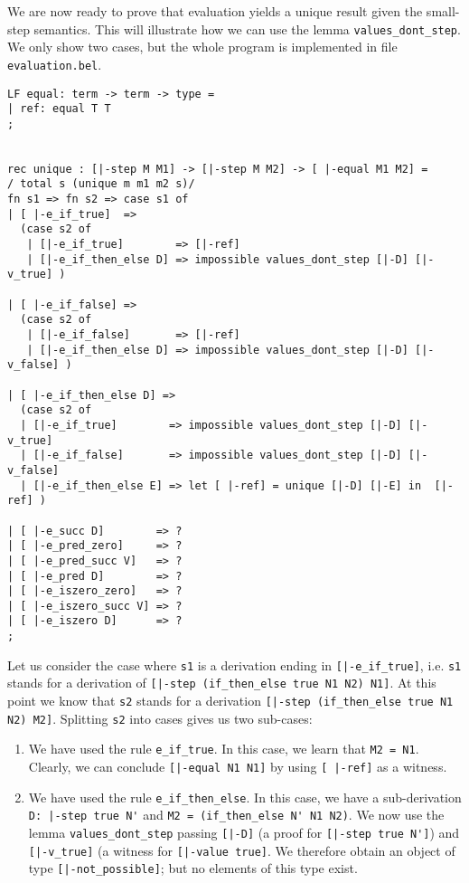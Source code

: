 We are now ready to prove that evaluation yields a unique result given the
small-step semantics. This will illustrate how we can use the lemma \lstinline!values_dont_step!. We only show two cases, but the whole program is
implemented in file \lstinline!evaluation.bel!.

\begin{lstlisting}
LF equal: term -> term -> type =
| ref: equal T T
;


rec unique : [|-step M M1] -> [|-step M M2] -> [ |-equal M1 M2] =
/ total s (unique m m1 m2 s)/
fn s1 => fn s2 => case s1 of
| [ |-e_if_true]  =>
  (case s2 of
   | [|-e_if_true]        => [|-ref]
   | [|-e_if_then_else D] => impossible values_dont_step [|-D] [|-v_true] )

| [ |-e_if_false] =>
  (case s2 of
   | [|-e_if_false]       => [|-ref]
   | [|-e_if_then_else D] => impossible values_dont_step [|-D] [|-v_false] )

| [ |-e_if_then_else D] =>
  (case s2 of
  | [|-e_if_true]        => impossible values_dont_step [|-D] [|-v_true] 
  | [|-e_if_false]       => impossible values_dont_step [|-D] [|-v_false]
  | [|-e_if_then_else E] => let [ |-ref] = unique [|-D] [|-E] in  [|-ref] )

| [ |-e_succ D]        => ?
| [ |-e_pred_zero]     => ?
| [ |-e_pred_succ V]   => ?
| [ |-e_pred D]        => ?
| [ |-e_iszero_zero]   => ?
| [ |-e_iszero_succ V] => ?
| [ |-e_iszero D]      => ?
;
\end{lstlisting}

Let us consider the case where \lstinline!s1! is a derivation ending in
\lstinline![|-e_if_true]!, i.e. \lstinline!s1! stands for a derivation of 
\lstinline![|-step (if_then_else true N1 N2) N1]!. At this point we know that \lstinline!s2! stands
for a derivation \lstinline![|-step (if_then_else true N1 N2) M2]!. Splitting
\lstinline!s2! into cases gives us two sub-cases:
\begin{enumerate}
\item We have used the rule
\lstinline!e_if_true!. In this case, we learn that
\lstinline!M2 = N1!. Clearly, we can conclude \lstinline![|-equal N1 N1]! by
using \lstinline![ |-ref]! as a witness.

\item We have used the rule \lstinline!e_if_then_else!. In this case, we have a
  sub-derivation \lstinline!D: |-step true N'! and \lstinline!M2 = (if_then_else N' N1 N2)!.
We now use the lemma \lstinline!values_dont_step! passing \lstinline![|-D]! (a
proof for \lstinline![|-step true N']!) and \lstinline![|-v_true]! (a witness
for \lstinline![|-value true]!.
We therefore obtain an object of type \lstinline![|-not_possible]!; but no
elements of this type exist.
\end{enumerate}

